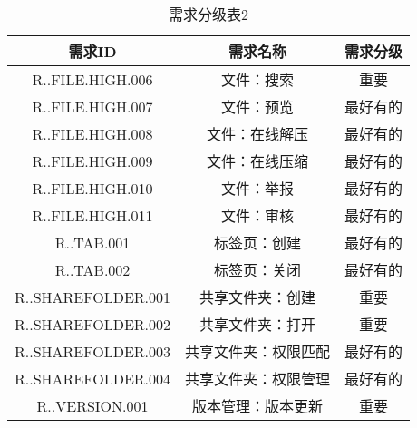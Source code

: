 \begin{table}[htbp]
\centering
\caption{需求分级表2} \label{tab:abbr}
\begin{tabular}{|c|c|c|}
    \hline
    需求ID & 需求名称 & 需求分级 \\
    \hline
    R..FILE.HIGH.006 & 文件：搜索 & 重要 \\
    \hline
    R..FILE.HIGH.007 & 文件：预览 & 最好有的 \\
    \hline
    R..FILE.HIGH.008 & 文件：在线解压 & 最好有的 \\
    \hline
    R..FILE.HIGH.009 & 文件：在线压缩 & 最好有的 \\
    \hline
    R..FILE.HIGH.010 & 文件：举报 & 最好有的 \\
    \hline
    R..FILE.HIGH.011 & 文件：审核 & 最好有的 \\
    \hline
    R..TAB.001 & 标签页：创建 & 最好有的 \\
    \hline
    R..TAB.002 & 标签页：关闭 & 最好有的 \\
    \hline
    R..SHAREFOLDER.001 & 共享文件夹：创建 & 重要 \\
    \hline
    R..SHAREFOLDER.002 & 共享文件夹：打开 & 重要 \\
    \hline
    R..SHAREFOLDER.003 & 共享文件夹：权限匹配 & 最好有的 \\
    \hline
    R..SHAREFOLDER.004 & 共享文件夹：权限管理 & 最好有的 \\
    \hline
    R..VERSION.001 & 版本管理：版本更新 & 重要 \\
    \hline
\end{tabular}
\end{table}
